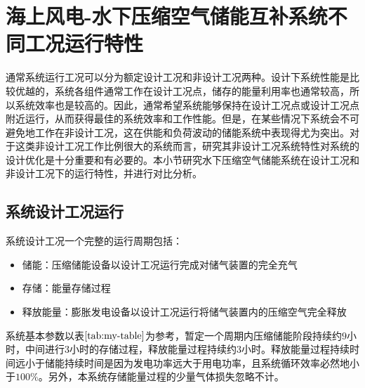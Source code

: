 \documentclass{jnuthesis}
\begin{document}
	\chapter{海上风电-水下压缩空气储能互补系统不同工况运行特性}
	
	
	\par 通常系统运行工况可以分为额定设计工况和非设计工况两种。设计下系统性能是比较优越的，系统各组件通常工作在设计工况点，储存的能量利用率也通常较高，所以系统效率也是较高的。因此，通常希望系统能够保持在设计工况点或设计工况点附近运行，从而获得最佳的系统效率和工作性能。但是，在某些情况下系统会不可避免地工作在非设计工况，这在供能和负荷波动的储能系统中表现得尤为突出。对于这类非设计工况工作比例很大的系统而言，研究其非设计工况系统特性对系统的设计优化是十分重要和有必要的。本小节研究水下压缩空气储能系统在设计工况和非设计工况下的运行特性，并进行对比分析。
	
	\section{系统设计工况运行}
	
	\par 系统设计工况一个完整的运行周期包括：
	\begin{itemize}
		\item 储能：压缩储能设备以设计工况运行完成对储气装置的完全充气
		\item 存储：能量存储过程
		\item 释放能量：膨胀发电设备以设计工况运行将储气装置内的压缩空气完全释放
	\end{itemize}
	
	\par 系统基本参数以表$ \fontsize{10.5bp}{10pt}\ref{tab:my-table} $为参考，暂定一个周期内压缩储能阶段持续约$ 9 $小时，中间进行$ 3 $小时的存储过程，释放能量过程持续约$ 3 $小时。释放能量过程持续时间远小于储能持续时间是因为发电功率远大于用电功率，且系统循环效率必然地小于$ 100\% $。另外，本系统存储能量过程的少量气体损失忽略不计。
	
\end{document}
